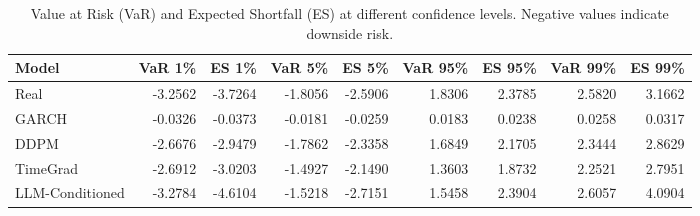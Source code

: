 \begin{table}[htbp]
\centering
\begin{tabular}{lrrrrrrrr}
\toprule
Model & VaR 1\% & ES 1\% & VaR 5\% & ES 5\% & VaR 95\% & ES 95\% & VaR 99\% & ES 99\% \\
\midrule
Real & -3.2562 & -3.7264 & -1.8056 & -2.5906 & 1.8306 & 2.3785 & 2.5820 & 3.1662 \\
GARCH & -0.0326 & -0.0373 & -0.0181 & -0.0259 & 0.0183 & 0.0238 & 0.0258 & 0.0317 \\
DDPM & -2.6676 & -2.9479 & -1.7862 & -2.3358 & 1.6849 & 2.1705 & 2.3444 & 2.8629 \\
TimeGrad & -2.6912 & -3.0203 & -1.4927 & -2.1490 & 1.3603 & 1.8732 & 2.2521 & 2.7951 \\
LLM-Conditioned & -3.2784 & -4.6104 & -1.5218 & -2.7151 & 1.5458 & 2.3904 & 2.6057 & 4.0904 \\
\bottomrule
\end{tabular}
\caption{Value at Risk (VaR) and Expected Shortfall (ES) at different confidence levels. Negative values indicate downside risk.}
\label{tab:var_es}
\end{table}
